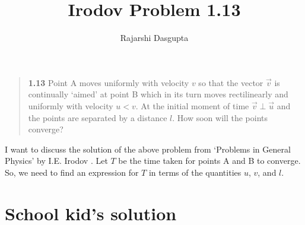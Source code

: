 \documentclass{article}
\title{Irodov Problem 1.13}
\author{Rajarshi Dasgupta}
\begin{document}
\maketitle

\begin{quote}
	{ \bf 1.13 }
	Point A moves uniformly with velocity $v$
	so that the vector $\vec{v}$
	is continually `aimed' at point B
	which in its turn moves rectilinearly and uniformly
	with velocity $u < v$.
	At the initial moment of time $\vec{v} \perp \vec{u}$
	and the points are separated by a distance $l$.
	How soon will the points converge?
\end{quote}
I want to discuss the solution of the above problem
from `Problems in General Physics'
by I.E. Irodov \cite{Irodov}.
Let $T$ be the time taken for points A and B to converge.
So, we need to find an expression for $T$
in terms of the quantities $u$, $v$, and $l$.

\section{School kid's solution}
\end{document}

